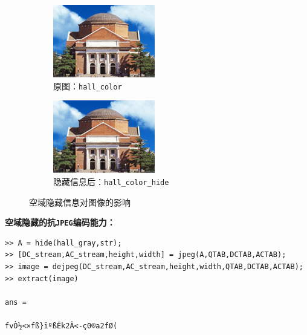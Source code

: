 \documentclass{article}
\numberwithin{figure}{section}
\numberwithin{table}{section}
\numberwithin{listing}{section}
\numberwithin{equation}{section}
\begin{document}
\begin{enumerate}
                \begin{figure}[H]
                    \centering
                    \begin{subfigure}{0.5\textwidth}
                        \centering
                        \includegraphics[width=0.6\linewidth]{hall_color}
                        \caption{原图：\texttt{hall\_color}}
                    \end{subfigure}%
                    \begin{subfigure}{0.5\textwidth}
                        \centering
                        \includegraphics[width=0.6\linewidth]{hall_color_hide}
                        \caption{隐藏信息后：\texttt{hall\_color\_hide}}
                    \end{subfigure}
                    \caption{空域隐藏信息对图像的影响}
                \end{figure}

                \textbf{空域隐藏的抗\texttt{JPEG}编码能力：}

                \begin{verbatim}
>> A = hide(hall_gray,str);
>> [DC_stream,AC_stream,height,width] = jpeg(A,QTAB,DCTAB,ACTAB);
>> image = dejpeg(DC_stream,AC_stream,height,width,QTAB,DCTAB,ACTAB);
>> extract(image)

ans =

fvÒ½<×fß}ïºßËk2Â<-ç0®a2fØ( 
                \end{verbatim}


\end{enumerate}
\end{document}
